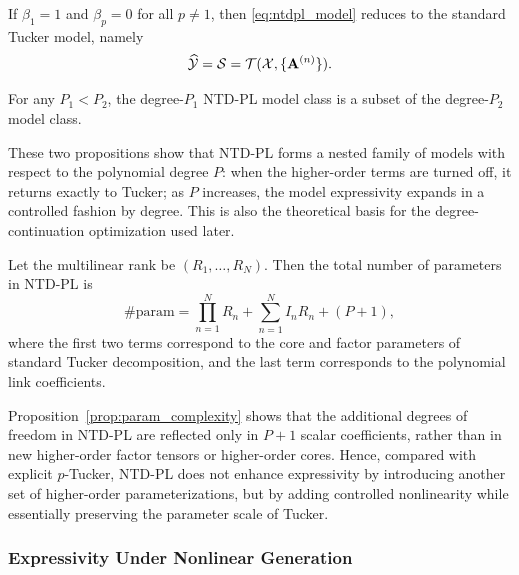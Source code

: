 \begin{proposition}
\label{prop:tucker_special_case}
If $\beta_1=1$ and $\beta_p=0$ for all $p\neq 1$, then \eqref{eq:ntdpl_model} reduces to the standard Tucker model, namely
\begin{equation}
\widehat{\mathcal{Y}}
=
\mathcal{S}
=
\mathcal{T}(\mathcal{X},\{\mathbf{A}^{(n)}\}).
\end{equation}
\end{proposition}

\begin{proposition}
\label{prop:nested_model_family}
For any $P_1<P_2$, the degree-$P_1$ NTD-PL model class is a subset of the degree-$P_2$ model class.
\end{proposition}

These two propositions show that NTD-PL forms a nested family of models with respect to the polynomial degree $P$: when the higher-order terms are turned off, it returns exactly to Tucker; as $P$ increases, the model expressivity expands in a controlled fashion by degree. This is also the theoretical basis for the degree-continuation optimization used later.

\begin{proposition}
\label{prop:param_complexity}
Let the multilinear rank be $(R_1,\dots,R_N)$. Then the total number of parameters in NTD-PL is
\begin{equation}
\#\mathrm{param}
=
\prod_{n=1}^{N}R_n
+
\sum_{n=1}^{N}I_nR_n
+
(P+1),
\label{eq:ntdpl_param_count_main}
\end{equation}
where the first two terms correspond to the core and factor parameters of standard Tucker decomposition, and the last term corresponds to the polynomial link coefficients.
\end{proposition}

Proposition~\ref{prop:param_complexity} shows that the additional degrees of freedom in NTD-PL are reflected only in $P+1$ scalar coefficients, rather than in new higher-order factor tensors or higher-order cores. Hence, compared with explicit $p$-Tucker, NTD-PL does not enhance expressivity by introducing another set of higher-order parameterizations, but by adding controlled nonlinearity while essentially preserving the parameter scale of Tucker.

\subsubsection{Expressivity Under Nonlinear Generation}

